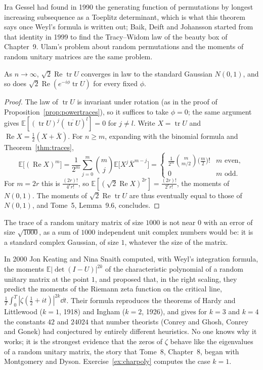 Ira Gessel had found in 1990 the generating function of permutations by longest increasing subsequence as a Toeplitz determinant, which is what this theorem says once Weyl's formula is written out; Baik, Deift and Johansson started from that identity in 1999
to find the Tracy--Widom law of the beauty box of Chapter~9. Ulam's problem about random permutations and the moments of random unitary matrices are the same problem.

\begin{corollary}\label{cor:gaussiantrace}
As $n\to\infty$, $\sqrt2\operatorname{Re}\operatorname{tr}U$ converges in law to the standard Gaussian $N(0,1)$, and so does $\sqrt2\operatorname{Re}(e^{-i\phi}\operatorname{tr}U)$ for every fixed $\phi$.
\end{corollary}

\begin{proof}
The law of $\operatorname{tr}U$ is invariant under rotation (as in the proof of Proposition~\ref{prop:powertraces}), so it suffices to take $\phi=0$; the same argument gives $\mathbb E[(\operatorname{tr}U)^j(\overline{\operatorname{tr}U})^l]=0$ for $j\ne l$. Write $X=\operatorname{tr}U$ and
$\operatorname{Re}X=\frac12(X+\bar X)$. For $n\ge m$, expanding with the binomial formula and Theorem~\ref{thm:traces},
\[
\mathbb E\bigl[(\operatorname{Re}X)^m\bigr]=\frac1{2^m}\sum_{j=0}^m\binom mj\mathbb E\bigl[X^j\bar X^{m-j}\bigr]=\begin{cases}\frac1{2^m}\binom m{m/2}\bigl(\frac m2\bigr)!&m\text{ even},\\0&m\text{ odd}.\end{cases}
\]
For $m=2r$ this is $\frac{(2r)!}{4^rr!}$, so $\mathbb E[(\sqrt2\operatorname{Re}X)^{2r}]=\frac{(2r)!}{2^rr!}$, the moments of $N(0,1)$. The moments of $\sqrt2\operatorname{Re}\operatorname{tr}U$ are thus eventually equal to those of $N(0,1)$, and Tome~5, Lemma~9.6, concludes.
\end{proof}

The trace of a random unitary matrix of size $1000$ is not near $0$ with an error of size $\sqrt{1000}$, as a sum of $1000$ independent unit complex numbers would be: it is a standard complex Gaussian, of size $1$, whatever the size of the matrix.

\begin{beauty}
In 2000 Jon Keating and Nina Snaith computed, with Weyl's integration formula, the moments $\mathbb E|\det(I-U)|^{2k}$ of the characteristic polynomial of a random unitary matrix at the point $1$, and proposed that, in the right scaling, they predict the moments of the
Riemann zeta function on the critical line, $\frac1T\int_0^T|\zeta(\frac12+it)|^{2k}\dd t$. Their formula reproduces the theorems of Hardy and Littlewood ($k=1$, 1918) and Ingham ($k=2$, 1926), and gives for $k=3$ and $k=4$ the constants $42$ and $24024$ that number theorists
(Conrey and Ghosh, Conrey and Gonek) had conjectured by entirely different heuristics. No one knows why it works; it is the strongest evidence that the zeros of $\zeta$ behave like the eigenvalues of a random unitary matrix, the
story that Tome~8, Chapter~8, began with Montgomery and Dyson. Exercise~\ref{ex:charpoly} computes the case $k=1$.
\end{beauty}

